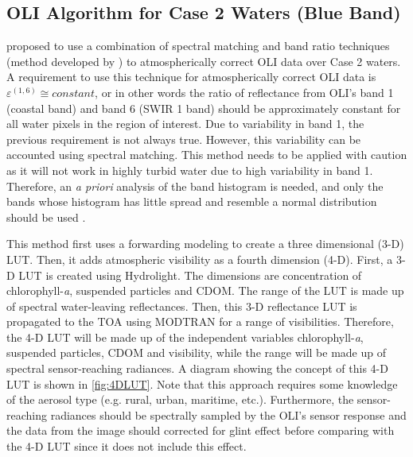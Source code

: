 \subsection{OLI Algorithm for Case 2 Waters (Blue Band)}
\cite{GeraceThesis} proposed to use a combination of spectral matching and band ratio techniques (method developed by \cite{Gordon:1994}) to atmospherically correct OLI data over Case 2 waters. A requirement to use this technique for atmospherically correct OLI data is $\varepsilon^{(1,6)}\cong constant$, or in other words the ratio of reflectance from OLI's band 1 (coastal band) and band 6 (SWIR 1 band) should be approximately constant for all water pixels in the region of interest. Due to variability in band 1, the previous requirement is not always true. However, this variability can be accounted using spectral matching. This method needs to be applied with caution as it will not work in highly turbid water due to high variability in band 1. Therefore, an {\it a priori} analysis of the band histogram is needed, and only the bands whose histogram has little spread and resemble a normal distribution should be used \cite{GeraceThesis}.

This method first uses a forwarding modeling to create a three dimensional (3-D) LUT. Then, it adds atmospheric visibility as a fourth dimension (4-D). First, a 3-D LUT is created using Hydrolight. The dimensions are concentration of chlorophyll-{\it a}, suspended particles and CDOM. The range of the LUT is made up of spectral water-leaving reflectances. Then, this 3-D reflectance LUT is propagated to the TOA using MODTRAN for a range of visibilities. Therefore, the 4-D LUT will be made up of the independent variables chlorophyll-{\it a}, suspended particles, CDOM and visibility, while the range will be made up of spectral sensor-reaching radiances. A diagram showing the concept of this 4-D LUT is shown in \autoref{fig:4DLUT}. Note that this approach requires some knowledge of the aerosol type (e.g. rural, urban, maritime, etc.). Furthermore, the sensor-reaching radiances should be spectrally sampled by the OLI's sensor response and the data from the image should corrected for glint effect before comparing with the 4-D LUT since it does not include this effect.


